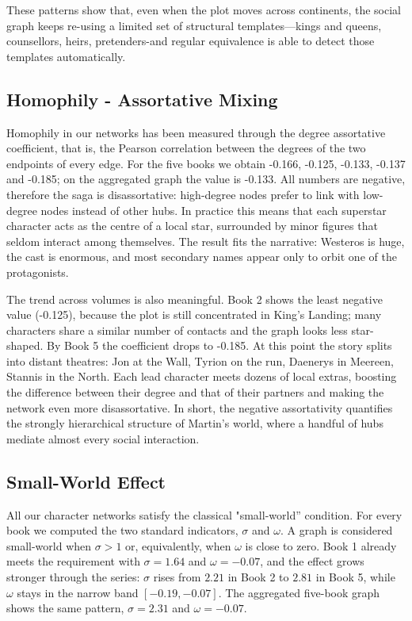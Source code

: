 \documentclass[12pt, a4paper]{article}
\begin{document}
These patterns show that, even when the plot moves across continents, the social graph keeps re-using a limited set of structural templates—kings and queens, counsellors, heirs, pretenders-and regular equivalence is able to detect those templates automatically.
\subsection*{Homophily - Assortative Mixing}

Homophily in our networks has been measured through the degree assortative coefficient, that is, the Pearson correlation between the degrees of the two endpoints of every edge.
For the five books we obtain -0.166, -0.125, -0.133, -0.137 and -0.185; on the aggregated graph the value is -0.133.
All numbers are negative, therefore the saga is disassortative: high-degree nodes prefer to link with low-degree nodes instead of other hubs.
In practice this means that each superstar character acts as the centre of a local star, surrounded by minor figures that seldom interact among themselves.
The result fits the narrative: Westeros is huge, the cast is enormous, and most secondary names appear only to orbit one of the protagonists.

The trend across volumes is also meaningful. Book 2 shows the least negative value (-0.125), because the plot is still concentrated in King's Landing; many characters share a similar number of contacts and the graph looks less star-shaped.
By Book 5 the coefficient drops to -0.185.  At this point the story splits into distant theatres: Jon at the Wall, Tyrion on the run, Daenerys in Meereen, Stannis in the North.  Each lead character meets dozens of local extras, boosting the difference between their degree and that of their partners and making the network even more disassortative.
In short, the negative assortativity quantifies the strongly hierarchical structure of Martin's world, where a handful of hubs mediate almost every social interaction.

\subsection*{Small-World Effect} 

All our character networks satisfy the classical "small-world'' condition.
For every book we computed the two standard indicators, 
$\sigma$ and $\omega$.
A graph is considered small-world when $\sigma>1$ or, equivalently, when $\omega$ is close to zero.
Book 1 already meets the requirement with $\sigma=1.64$ and $\omega=-0.07$, and the effect grows stronger through the series: $\sigma$ rises from $2.21$ in Book 2 to $2.81$ in Book 5, while $\omega$ stays in the narrow band $[-0.19,-0.07]$.
The aggregated five-book graph shows the same pattern, $\sigma=2.31$ and $\omega=-0.07$.
\end{document}
